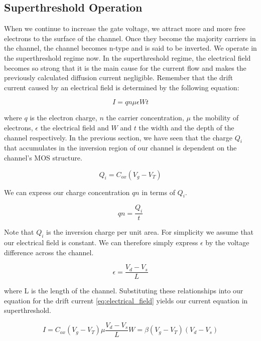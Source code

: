 \subsection{Superthreshold Operation}

When we continue to increase the gate voltage, we attract more and more free electrons to the surface of the channel. Once they become the majority carriers in the channel, the channel becomes n-type and is said to be inverted. We operate in the superthreshold regime now. In the superthreshold regime, the electrical field becomes so strong that it is the main cause for the current flow and makes the previously calculated diffusion current negligible. Remember that the drift current caused by an electrical field is determined by the following equation:

\begin{equation}
    I = q n \mu \epsilon W t\label{eq:electrical_field}
\end{equation}

where $q$ is the electron charge, $n$ the carrier concentration, $\mu$ the mobility of electrons, $\epsilon$ the electrical field and $W$ and $t$ the width and the depth of the channel respectively. In the previous section, we have seen that the charge $Q_i$ that accumulates in the inversion region of our channel is dependent on the channel's MOS structure.

\begin{equation}
    Q_i = C_{ox} (V_g - V_T)
\end{equation}

We can express our charge concentration $qn$ in terms of $Q_i$.

\begin{equation}
    qn = \frac{Q_i}{t}
\end{equation}

Note that $Q_i$ is the inversion charge per unit area. For simplicity we assume that our electrical field is constant. We can therefore simply express $\epsilon$ by the voltage difference across the channel.

\begin{equation}
    \epsilon = \frac{V_d - V_s}{L}
\end{equation}

where L is the length of the channel. Substituting these relationships into our equation for the drift current \eqref{eq:electrical_field} yields our current equation in superthreshold.

\begin{equation}
    I = C_{ox} (V_g - V_T) \mu \frac{V_d - V_s}{L} W = \beta (V_g - V_T) (V_d - V_s) 
\end{equation}

